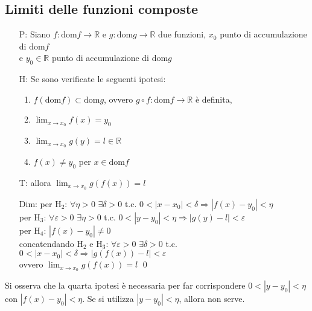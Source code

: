 \documentclass[a4paper]{article}
\newcommand\dom{\text{dom}}
\begin{document}
\subsection{Limiti delle funzioni composte}
\begin{itemize}
	\item[P:] Siano \(f: \dom f \to \mathbb{R}\) e \(g: \dom g \to \mathbb{R}\) due funzioni, 
	\(x_0\) punto di accumulazione di \(\dom f\) \\ e \(y_0 \in \mathbb{R}\) punto di accumulazione di \(\dom g\)
	\item[H:] Se sono verificate le seguenti ipotesi:
	\begin{enumerate}
		\item \(f(\dom f) \subset \dom g\), ovvero \(g \circ f : \dom f \to \mathbb{R}\) è definita,
		\item \(\displaystyle \lim_{x \to x_0} f(x) = y_0\)
		\item \(\displaystyle \lim_{x \to x_0} g(y) = l \in \mathbb{R}\)
		\item \(f(x) \neq y_0\) per \(x \in \dom f\)
	\end{enumerate}
	\item[T:] allora \(\displaystyle \lim_{x \to x_0} g(f(x)) = l\)
	\item[Dim:] per H\(_2\): \(\forall \eta > 0\) \(\exists \delta > 0\) t.c. \(0 < \left| x - x_0 \right| < \delta \Rightarrow \left| f(x) - y_0 \right| < \eta\) \\
	per H\(_3\): \(\forall \varepsilon > 0\) \(\exists \eta > 0\) t.c. \(0 < \left| y - y_0 \right| < \eta \Rightarrow \left| g(y) - l \right| < \varepsilon\) \\
	per H\(_4\): \(\left| f(x) - y_0 \right| \neq 0 \) \\
	concatendando H\(_2\) e H\(_3\): \(\forall \varepsilon > 0\) \(\exists \delta > 0\) t.c. \(0 < \left| x - x_0 \right| < \delta \Rightarrow \left| g(f(x)) - l \right| < \varepsilon\) \\
	ovvero \(\displaystyle \lim_{x \to x_0} g(f(x)) = l\) \qed
\end{itemize}

Si osserva che la quarta ipotesi è necessaria per far corrispondere \(0 < \left|y - y_0\right| < \eta\) con \(\left|f(x) - y_0\right| < \eta\).
Se si utilizza \(\left|y - y_0\right|<\eta\), allora non serve.
\end{document}
